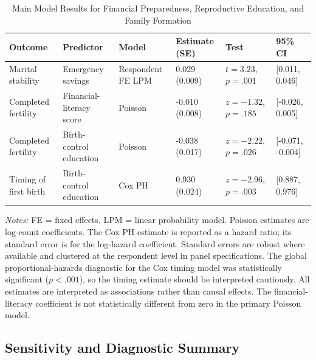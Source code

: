 \documentclass[12pt]{article}
\begin{document}
\begin{table}[!htbp]
\centering
\caption{Main Model Results for Financial Preparedness, Reproductive Education, and Family Formation}
\label{tab:main_results}
\small
\begin{adjustbox}{max width=\textwidth}
\begin{tabularx}{\textwidth}{Y Y p{0.15\textwidth} p{0.13\textwidth} p{0.13\textwidth} p{0.16\textwidth}}
\toprule
\textbf{Outcome} & \textbf{Predictor} & \textbf{Model} & \textbf{Estimate (SE)} & \textbf{Test} & \textbf{95\% CI} \\
\midrule
Marital stability & Emergency savings & Respondent FE LPM & 0.029 (0.009) & $t = 3.23$, $p = .001$ & [0.011, 0.046] \\
Completed fertility & Financial-literacy score & Poisson & -0.010 (0.008) & $z = -1.32$, $p = .185$ & [-0.026, 0.005] \\
Completed fertility & Birth-control education & Poisson & -0.038 (0.017) & $z = -2.22$, $p = .026$ & [-0.071, -0.004] \\
Timing of first birth & Birth-control education & Cox PH & 0.930 (0.024) & $z = -2.96$, $p = .003$ & [0.887, 0.976] \\
\bottomrule
\end{tabularx}
\end{adjustbox}
\begin{minipage}{0.95\textwidth}
\footnotesize \textit{Notes:} FE = fixed effects. LPM = linear probability model. Poisson estimates are log-count coefficients. The Cox PH estimate is reported as a hazard ratio; its standard error is for the log-hazard coefficient. Standard errors are robust where available and clustered at the respondent level in panel specifications. The global proportional-hazards diagnostic for the Cox timing model was statistically significant ($p < .001$), so the timing estimate should be interpreted cautiously. All estimates are interpreted as associations rather than causal effects. The financial-literacy coefficient is not statistically different from zero in the primary Poisson model.
\end{minipage}
\end{table}


\subsection{Sensitivity and Diagnostic Summary}
\end{document}
